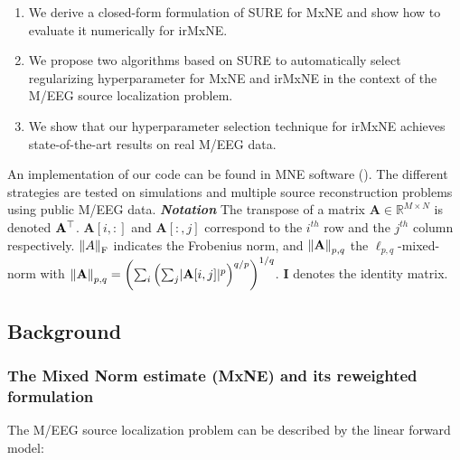\begin{enumerate}
    \item We derive a closed-form formulation of SURE for MxNE and show how to evaluate it numerically
    for irMxNE.

    \item We propose two algorithms based on SURE to automatically select regularizing hyperparameter for MxNE and irMxNE
    in the context of the M/EEG source localization problem.

    \item We show that our hyperparameter selection technique for irMxNE achieves state-of-the-art results on real M/EEG data.
\end{enumerate}

An implementation of our code can be found in MNE software (\cite{mne}).
The different strategies are tested on simulations and multiple source reconstruction 
problems using public M/EEG data.
%
\newline
\newline
%
\textit{\textbf{Notation}} The transpose of a matrix $\mathbf{A} \in \mathbb{R}^{M \times N}$ is
denoted $\bf{A}^\top$. $\mathbf{A}[i,:]$ and $\mathbf{A}[:,j]$ correspond to the $i^{th}$
row and the $j^{th}$ column respectively. $\left \lVert A \right \rVert_{\text{F}}$ indicates the Frobenius norm,
and $\left \lVert \mathbf{A} \right \rVert_{p,q}$ the $\ell_{p,q}$-mixed-norm with $\left \lVert \mathbf{A} \right \rVert_{p,q} 
= \left(\sum_i \left(\sum_j \lvert \mathbf{A}[i,j] \rvert^p\right)^{q/p}\right)^{1/q}$.
$\mathbf{I}$ denotes the identity matrix.


\subsection{Background}
\label{sub:background}
%

\subsubsection{The Mixed Norm estimate (MxNE) and its reweighted formulation}

The M/EEG source localization problem can be described by the linear forward model:

